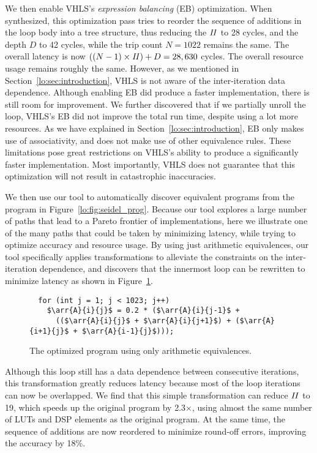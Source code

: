 We then enable VHLS's \emph{expression balancing} (EB) optimization.  When
synthesized, this optimization pass tries to reorder the sequence of additions
in the loop body into a tree structure, thus reducing the $\mathit{II}$ to 28
cycles, and the depth $D$ to 42 cycles, while the trip count $N = 1022$
remains the same.  The overall latency is now $((N-1) \times \mathit{II}) + D =
28,630$ cycles.  The overall resource usage remains roughly the same.
However, as we mentioned in Section~\ref{lo:sec:introduction}, VHLS is not
aware of the inter-iteration data dependence.  Although enabling EB did
produce a faster implementation, there is still room for improvement.  We
further discovered that if we partially unroll the loop, VHLS's EB did
not improve the total run time, despite using a lot more resources.  As
we have explained in Section~\ref{lo:sec:introduction}, EB only makes
use of associativity, and does not make use of other equivalence rules.
These limitations pose great restrictions on VHLS's ability to produce a
significantly faster implementation.  Most importantly, VHLS does not guarantee
that this optimization will not result in catastrophic inaccuracies.

We then use our tool to automatically discover equivalent programs from the
program in Figure~\ref{lo:fig:seidel_prog}.  Because our tool explores a
large number of paths that lead to a Pareto frontier of implementations,
here we illustrate one of the many paths that could be taken by minimizing
latency, while trying to optimize accuracy and resource usage.  By using just
arithmetic equivalences, our tool specifically applies transformations to
alleviate the constraints on the inter-iteration dependence, and discovers
that the innermost loop can be rewritten to minimize latency as shown in
Figure~\ref{lo:fig:seidel_prog_2}.

\begin{figure}[ht]
\begin{lstlisting}
  for (int j = 1; j < 1023; j++)
    $\arr{A}{i}{j}$ = 0.2 * ($\arr{A}{i}{j-1}$ +
      (($\arr{A}{i}{j}$ + $\arr{A}{i}{j+1}$) + ($\arr{A}{i+1}{j}$ + $\arr{A}{i-1}{j}$)));
\end{lstlisting}
    \caption{The optimized program using only arithmetic equivalences.}
    \label{lo:fig:seidel_prog_2}
\end{figure}

Although this loop still has a data dependence between consecutive iterations,
this transformation greatly reduces latency because most of the loop iterations
can now be overlapped.  We find that this simple transformation can reduce
$\mathit{II}$ to 19, which speeds up the original program by 2.3$\times$, using almost
the same number of LUTs and DSP elements as the original program.  At the same
time, the sequence of additions are now reordered to minimize round-off errors,
improving the accuracy by 18\%.


